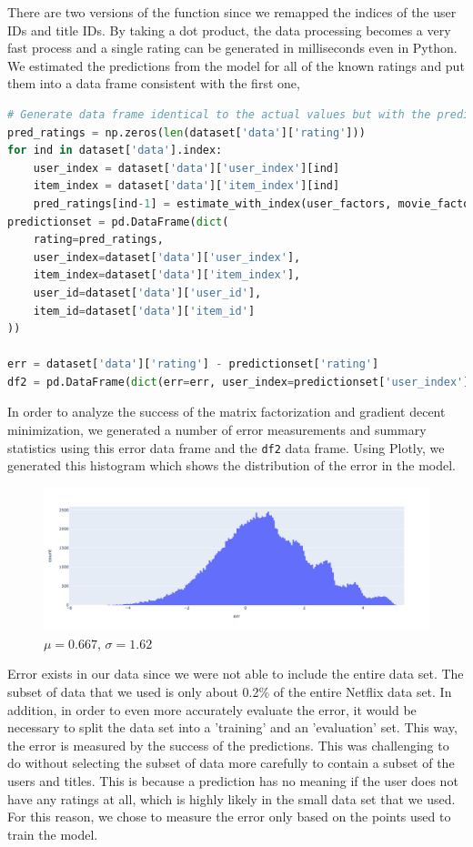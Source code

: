 \documentclass[11pt,a4paper]{article}
\begin{document}
There are two versions of the function since we remapped the indices of the user IDs and title IDs. By taking a dot product, the data processing becomes a very fast process and a single rating can be generated in milliseconds even in Python. We estimated the predictions from the model for all of the known ratings and put them into a data frame consistent with the first one,

\begin{lstlisting}[language=Python]
# Generate data frame identical to the actual values but with the predictions
pred_ratings = np.zeros(len(dataset['data']['rating']))
for ind in dataset['data'].index:
    user_index = dataset['data']['user_index'][ind]
    item_index = dataset['data']['item_index'][ind]
    pred_ratings[ind-1] = estimate_with_index(user_factors, movie_factors, user_index, item_index)
predictionset = pd.DataFrame(dict(
    rating=pred_ratings,
    user_index=dataset['data']['user_index'],
    item_index=dataset['data']['item_index'],
    user_id=dataset['data']['user_id'],
    item_id=dataset['data']['item_id']
))

err = dataset['data']['rating'] - predictionset['rating']
df2 = pd.DataFrame(dict(err=err, user_index=predictionset['user_index'], item_index=predictionset['item_index']))
\end{lstlisting}

In order to analyze the success of the matrix factorization and gradient decent minimization, we generated a number of error measurements and summary statistics using this error data frame and the \texttt{df2} data frame. Using Plotly, we generated this histogram which shows the distribution of the error in the model.

\begin{figure}[h]
    \centering
    \includegraphics[width=\textwidth]{histogram_err.png}
    \caption{$\mu=0.667$, $\sigma=1.62$}
\end{figure}

Error exists in our data since we were not able to include the entire data set. The subset of data that we used is only about 0.2\% of the entire Netflix data set. In addition, in order to even more accurately evaluate the error, it would be necessary to split the data set into a 'training' and an 'evaluation' set. This way, the error is measured by the success of the predictions. This was challenging to do without selecting the subset of data more carefully to contain a subset of the users and titles. This is because a prediction has no meaning if the user does not have any ratings at all, which is highly likely in the small data set that we used. For this reason, we chose to measure the error only based on the points used to train the model.
\end{document}
